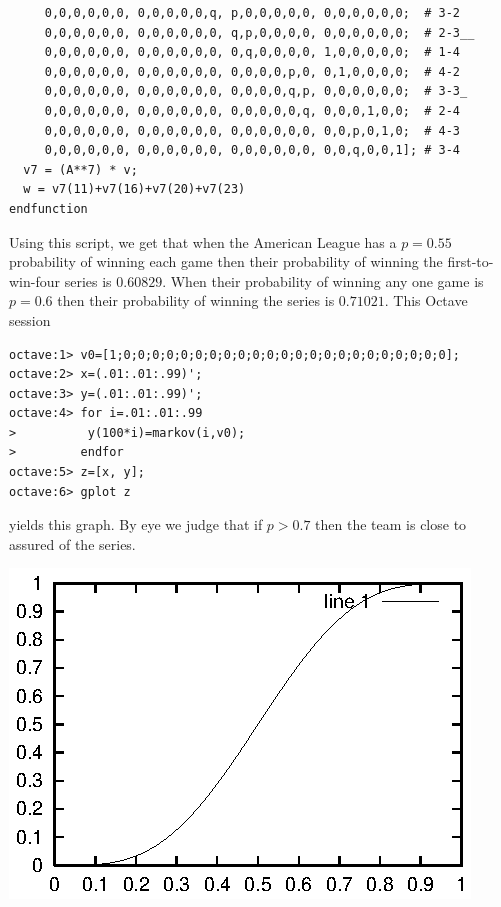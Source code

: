 \begin{exercises}
\begin{answer}
\begin{exparts}
\begin{lstlisting}
     0,0,0,0,0,0, 0,0,0,0,0,q, p,0,0,0,0,0, 0,0,0,0,0,0;  # 3-2
     0,0,0,0,0,0, 0,0,0,0,0,0, q,p,0,0,0,0, 0,0,0,0,0,0;  # 2-3__
     0,0,0,0,0,0, 0,0,0,0,0,0, 0,q,0,0,0,0, 1,0,0,0,0,0;  # 1-4
     0,0,0,0,0,0, 0,0,0,0,0,0, 0,0,0,0,p,0, 0,1,0,0,0,0;  # 4-2
     0,0,0,0,0,0, 0,0,0,0,0,0, 0,0,0,0,q,p, 0,0,0,0,0,0;  # 3-3_
     0,0,0,0,0,0, 0,0,0,0,0,0, 0,0,0,0,0,q, 0,0,0,1,0,0;  # 2-4
     0,0,0,0,0,0, 0,0,0,0,0,0, 0,0,0,0,0,0, 0,0,p,0,1,0;  # 4-3
     0,0,0,0,0,0, 0,0,0,0,0,0, 0,0,0,0,0,0, 0,0,q,0,0,1]; # 3-4
  v7 = (A**7) * v;
  w = v7(11)+v7(16)+v7(20)+v7(23)
endfunction
\end{lstlisting}
       Using this script, we get that when the American League has a
       $p=0.55$ probability of winning each game then their probability
       of winning the first-to-win-four series is $0.60829$.
       When their probability of winning any one game is $p=0.6$
       then their probability of winning the series is  
       $0.71021$.
      \partsitem This Octave session
\begin{lstlisting}
octave:1> v0=[1;0;0;0;0;0;0;0;0;0;0;0;0;0;0;0;0;0;0;0;0;0;0;0];
octave:2> x=(.01:.01:.99)';
octave:3> y=(.01:.01:.99)';
octave:4> for i=.01:.01:.99
>          y(100*i)=markov(i,v0);
>         endfor
octave:5> z=[x, y];
octave:6> gplot z
\end{lstlisting}
       yields this graph.
       By eye we judge that if $p>0.7$ then the team is close to assured
       of the series.
       \begin{center}
         \includegraphics{ws.eps}
       \end{center}
     \end{exparts}
    \end{answer}
  \item 

\end{exercises}
